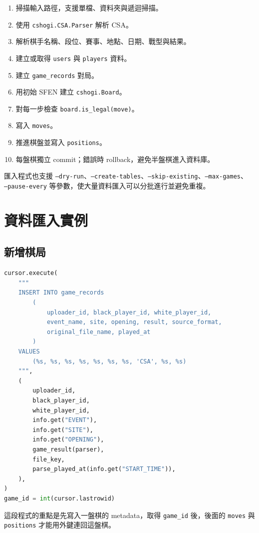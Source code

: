 \documentclass[12pt,a4paper,fontset=none]{ctexart}
\begin{document}
\begin{enumerate}
  \item 掃描輸入路徑，支援單檔、資料夾與遞迴掃描。
  \item 使用 \texttt{cshogi.CSA.Parser} 解析 CSA。
  \item 解析棋手名稱、段位、賽事、地點、日期、戰型與結果。
  \item 建立或取得 \texttt{users} 與 \texttt{players} 資料。
  \item 建立 \texttt{game\_records} 對局。
  \item 用初始 SFEN 建立 \texttt{cshogi.Board}。
  \item 對每一步檢查 \texttt{board.is\_legal(move)}。
  \item 寫入 \texttt{moves}。
  \item 推進棋盤並寫入 \texttt{positions}。
  \item 每盤棋獨立 commit；錯誤時 rollback，避免半盤棋進入資料庫。
\end{enumerate}

匯入程式也支援 \texttt{--dry-run}、\texttt{--create-tables}、\texttt{--skip-existing}、\texttt{--max-games}、\\
\texttt{--pause-every} 等參數，使大量資料匯入可以分批進行並避免重複。

\section{資料匯入實例}

\subsection{新增棋局}

\begin{lstlisting}[style=pystyle,language=Python]
cursor.execute(
    """
    INSERT INTO game_records
        (
            uploader_id, black_player_id, white_player_id,
            event_name, site, opening, result, source_format,
            original_file_name, played_at
        )
    VALUES
        (%s, %s, %s, %s, %s, %s, %s, 'CSA', %s, %s)
    """,
    (
        uploader_id,
        black_player_id,
        white_player_id,
        info.get("EVENT"),
        info.get("SITE"),
        info.get("OPENING"),
        game_result(parser),
        file_key,
        parse_played_at(info.get("START_TIME")),
    ),
)
game_id = int(cursor.lastrowid)
\end{lstlisting}

這段程式的重點是先寫入一盤棋的 metadata，取得 \texttt{game\_id} 後，後面的 \texttt{moves} 與 \texttt{positions} 才能用外鍵連回這盤棋。
\end{document}
